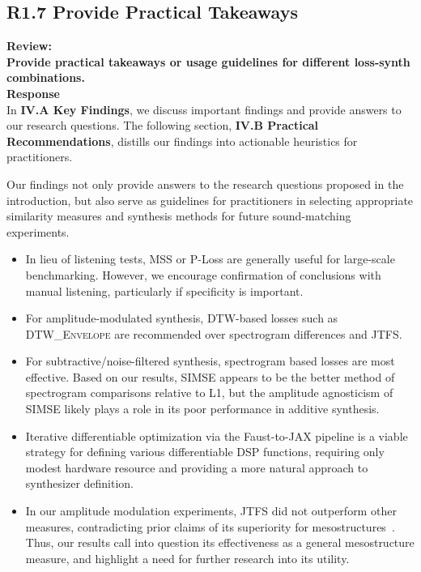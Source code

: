 \documentclass[11pt]{article}
\newcommand{\DTWEnv}{\textsc{DTW\_Envelope}}
\newcommand{\JTFS}{\textsc{JTFS}}
\begin{document}
\subsection{R1.7 Provide Practical Takeaways}
\label{R1.7}
\noindent\textbf{Review:} \\
\noindent \textbf{Provide practical takeaways or usage guidelines for different loss-synth combinations. } 
\\

\noindent\textbf{Response} \\

In \textbf{IV.A Key Findings}, we discuss important findings and provide answers to our research questions. The following section, \textbf{IV.B Practical Recommendations}, distills our findings into actionable heuristics for practitioners. 

\begin{displayquote}
    Our findings not only provide answers to the research questions proposed in the introduction, but also serve as guidelines for practitioners in selecting appropriate similarity measures and synthesis methods for future sound-matching experiments.
\begin{itemize}
    \item In lieu of listening tests, MSS or P-Loss are generally useful for large-scale benchmarking. However, we encourage confirmation of conclusions with manual listening, particularly if specificity is important. 
    \item For amplitude-modulated synthesis, DTW-based losses such as \DTWEnv{} are recommended over spectrogram differences and JTFS.
    \item  For subtractive/noise-filtered synthesis, spectrogram based losses are most effective. Based on our results, SIMSE appears to be the better method of spectrogram comparisons relative to L1, but the amplitude agnosticism of SIMSE likely plays a role in its poor performance in additive synthesis.
    \item Iterative differentiable optimization via the Faust-to-JAX pipeline is a viable strategy for defining various differentiable DSP functions, requiring only modest hardware resource and providing a more natural approach to synthesizer definition.
    \item In our amplitude modulation experiments, \JTFS{} did not outperform other measures, contradicting prior claims of its superiority for mesostructures~\cite{vahidi2023mesostructures}. Thus, our results call into question its effectiveness as a general mesostructure measure, and highlight a need for further research into its utility.
\end{itemize}

\end{displayquote}
\end{document}

